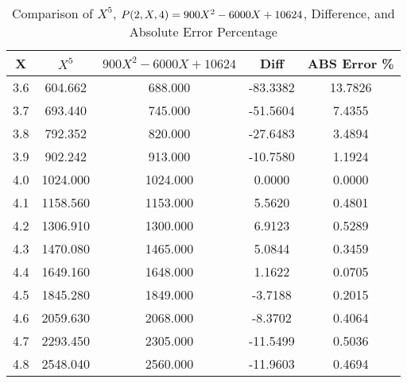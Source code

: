 ﻿%
\begin{table}[h!]
    \centering
    \caption{Comparison of $X^5$, ${P}(2,X,4) = 900X^2 - 6000X + 10624$, Difference, and Absolute Error Percentage}
    \begin{tabular}{|c|c|c|c|c|}
        \hline
        \textbf{X} & \textbf{$X^5$} & \textbf{$900X^2 - 6000X + 10624$} & \textbf{Diff} & \textbf{ABS Error \%} \\ \hline
        3.6        & 604.662        & 688.000                           & -83.3382      & 13.7826               \\ \hline
        3.7        & 693.440        & 745.000                           & -51.5604      & 7.4355                \\ \hline
        3.8        & 792.352        & 820.000                           & -27.6483      & 3.4894                \\ \hline
        3.9        & 902.242        & 913.000                           & -10.7580      & 1.1924                \\ \hline
        4.0        & 1024.000       & 1024.000                          & 0.0000        & 0.0000                \\ \hline
        4.1        & 1158.560       & 1153.000                          & 5.5620        & 0.4801                \\ \hline
        4.2        & 1306.910       & 1300.000                          & 6.9123        & 0.5289                \\ \hline
        4.3        & 1470.080       & 1465.000                          & 5.0844        & 0.3459                \\ \hline
        4.4        & 1649.160       & 1648.000                          & 1.1622        & 0.0705                \\ \hline
        4.5        & 1845.280       & 1849.000                          & -3.7188       & 0.2015                \\ \hline
        4.6        & 2059.630       & 2068.000                          & -8.3702       & 0.4064                \\ \hline
        4.7        & 2293.450       & 2305.000                          & -11.5499      & 0.5036                \\ \hline
        4.8        & 2548.040       & 2560.000                          & -11.9603      & 0.4694                \\ \hline

\end{tabular}
\end{table}
